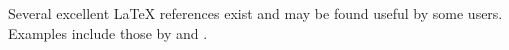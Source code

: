 Several excellent LaTeX references exist and may be found useful by some users. Examples include those by \citet{Knuth_1984_a} and \citet{Lamport_1986_a}.